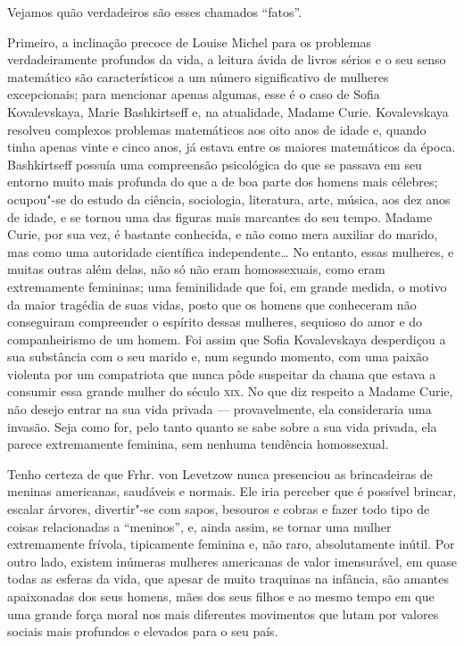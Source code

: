 Vejamos quão verdadeiros são esses chamados ``fatos''.

Primeiro, a inclinação precoce de Louise Michel para os problemas
verdadeiramente profundos da vida, a leitura ávida de livros sérios e o
seu senso matemático são característicos a um número significativo de
mulheres excepcionais; para mencionar apenas algumas, esse é o caso de
Sofia Kovalevskaya, Marie Bashkirtseff e, na atualidade, Madame Curie.
Kovalevskaya resolveu complexos problemas matemáticos aos oito anos de
idade e, quando tinha apenas vinte e cinco anos, já estava entre os
maiores matemáticos da época. Bashkirtseff possuía uma compreensão
psicológica do que se passava em seu entorno muito mais profunda do que a de
boa parte dos homens mais célebres; ocupou"-se do estudo da ciência,
sociologia, literatura, arte, música, aos dez anos de idade, e se tornou
uma das figuras mais marcantes do seu tempo. Madame Curie, por sua vez,
é bastante conhecida, e não como mera auxiliar do marido, mas como uma
autoridade científica independente\ldots{} No entanto, essas mulheres, e
muitas outras além delas, não só não eram homossexuais, como eram
extremamente femininas; uma feminilidade que foi, em grande medida, o
motivo da maior tragédia de suas vidas, posto que os homens que
conheceram não conseguiram compreender o espírito dessas mulheres,
sequioso do amor e do companheirismo de um homem. Foi assim que Sofia
Kovalevskaya desperdiçou a sua substância com o seu marido e, num
segundo momento, com uma paixão violenta por um compatriota que nunca
pôde suspeitar da chama que estava a consumir essa grande mulher do
século \textsc{xix}. No que diz respeito a Madame Curie, não desejo entrar na sua
vida privada --- provavelmente, ela consideraria uma invasão. Seja como
for, pelo tanto quanto se sabe sobre a sua vida privada, ela parece
extremamente feminina, sem nenhuma tendência homossexual.

Tenho certeza de que Frhr. von Levetzow nunca presenciou as brincadeiras de meninas americanas, saudáveis e normais. Ele iria perceber que é
possível brincar, escalar árvores, divertir"-se com sapos, besouros e
cobras e fazer todo tipo de coisas relacionadas a ``meninos'', e, ainda
assim, se tornar uma mulher extremamente frívola, tipicamente feminina
e, não raro, absolutamente inútil. Por outro lado, existem inúmeras
mulheres americanas de valor imensurável, em quase todas as esferas da
vida, que apesar de muito traquinas na infância, são amantes apaixonadas
dos seus homens, mães dos seus filhos e ao mesmo tempo em que uma grande
força moral nos mais diferentes movimentos que lutam por valores sociais
mais profundos e elevados para o seu país.


